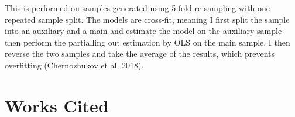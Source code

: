 \documentclass[
  letterpaper,
  DIV=11,
  numbers=noendperiod]{scrartcl}
\begin{document}
This is performed on samples generated using 5-fold re-sampling with one
repeated sample split. The models are cross-fit, meaning I first split
the sample into an auxiliary and a main and estimate the model on the
auxiliary sample then perform the partialling out estimation by OLS on
the main sample. I then reverse the two samples and take the average of
the results, which prevents overfitting (Chernozhukov et al. 2018).

\begin{table}

\caption{\label{tbl-dml}Double/debiased machine learning model.}


\end{table}%

\newpage

\section*{Works Cited}\label{works-cited}
\end{document}
